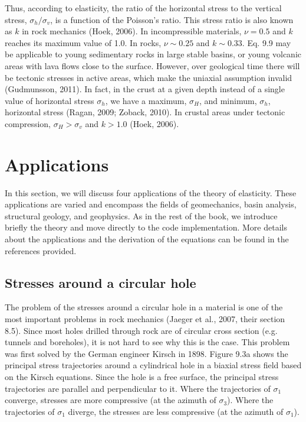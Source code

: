 \documentclass[a4paper , 12pt]{book}
\begin{document}
Thus, according to elasticity, the ratio of the horizontal stress to the vertical stress, $\sigma_h/\sigma_v$, is a function of the Poisson's ratio. This stress ratio is also known as $k$ in rock mechanics (Hoek, 2006). In incompressible materials, $\nu = 0.5$ and $k$ reaches its maximum value of 1.0. In rocks, $\nu\sim 0.25$ and $k\sim 0.33$. Eq. 9.9 may be applicable to young sedimentary rocks in large stable basins, or young volcanic areas with lava flows close to the surface. However, over geological time there will be tectonic stresses in active areas, which make the uniaxial assumption invalid (Gudmunsson, 2011). In fact, in the crust at a given depth instead of a single value of horizontal stress $\sigma_h$, we have a maximum, $\sigma_H$, and minimum, $\sigma_h$, horizontal stress (Ragan, 2009; Zoback, 2010). In crustal areas under tectonic compression, $\sigma_H>\sigma_v$ and $k>1.0$ (Hoek, 2006).

\section{Applications}\label{elastAppl}

In this section, we will discuss four applications of the theory of elasticity. These applications are varied and encompass the fields of geomechanics, basin analysis, structural geology, and geophysics. As in the rest of the book, we introduce briefly the theory and move directly to the code implementation. More details about the applications and the derivation of the equations can be found in the references provided.

\subsection{Stresses around a circular hole}

The problem of the stresses around a circular hole in a material is one of the most important problems in rock mechanics (Jaeger et al., 2007, their section 8.5). Since most holes drilled through rock are of circular cross section (e.g. tunnels and boreholes), it is not hard to see why this is the case. This problem was first solved by the German engineer Kirsch in 1898. Figure 9.3a shows the principal stress trajectories around a cylindrical hole in a biaxial stress field based on the Kirsch equations. Since the hole is a free surface, the principal stress trajectories are parallel and perpendicular to it. Where the trajectories of $\sigma_1$ converge, stresses are more compressive (at the azimuth of $\sigma_3$). Where the trajectories of $\sigma_1$ diverge, the stresses are less compressive (at the azimuth of $\sigma_1$).
\end{document}
